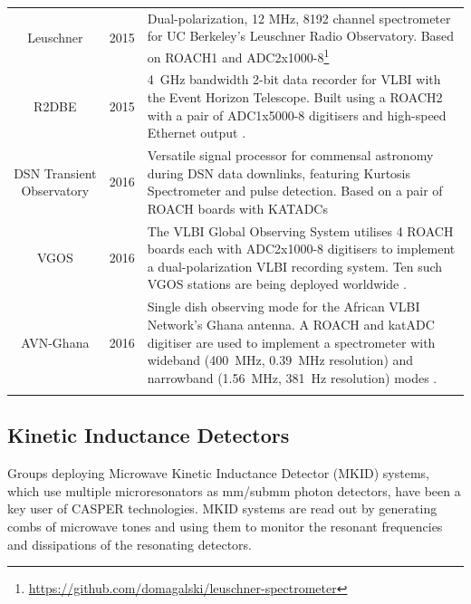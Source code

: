 \documentclass{ws-jai}
\begin{document}
\begin{longtable}{ccp{10cm}}
  Leuschner        & 2015 & Dual-polarization, 12 MHz, 8192 channel spectrometer for UC Berkeley's Leuschner Radio Observatory. Based on ROACH1 and ADC2x1000-8\footnote{\url{https://github.com/domagalski/leuschner-spectrometer}} \\
  R2DBE            & 2015 & 4~GHz bandwidth 2-bit data recorder for VLBI with the Event Horizon Telescope. Built using a ROACH2 with a pair of ADC1x5000-8 digitisers and high-speed Ethernet output \citep{r2dbe}. \\
  DSN Transient Observatory & 2016 & Versatile signal processor for commensal astronomy during DSN data downlinks, featuring Kurtosis Spectrometer and pulse detection. Based on a pair of ROACH boards with KATADCs \citep{dsn-transient-observatory} \\
  VGOS             & 2016 & The VLBI Global Observing System utilises 4 ROACH boards each with ADC2x1000-8 digitisers to implement a dual-polarization VLBI recording system. Ten such VGOS stations are being deployed worldwide \citep{2012ivs..conf....8H}.\\
  AVN-Ghana        & 2016 & Single dish observing mode for the African VLBI Network's Ghana antenna. A ROACH and katADC digitiser are used to implement a spectrometer with wideband (400~MHz, 0.39~MHz resolution) and narrowband (1.56~MHz, 381~Hz resolution) modes \citep{avn}.\\
  \label{table:casper-instruments-spectrometers}
\end{longtable}

\subsection{Kinetic Inductance Detectors}

Groups deploying Microwave Kinetic Inductance Detector (MKID) systems, which use multiple microresonators as mm/submm photon detectors, have been a key user of CASPER technologies. MKID systems are read out by generating combs of microwave tones and using them to monitor the resonant frequencies and dissipations of the resonating detectors.
\end{document}
